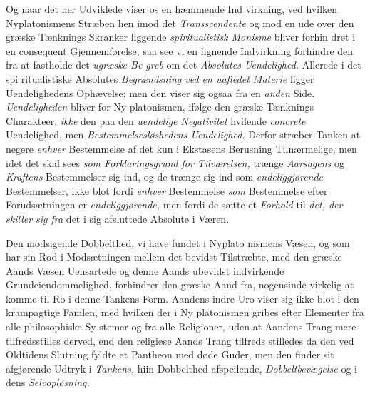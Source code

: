 Og naar det her Udviklede viser os en hæmmende Ind\-%
virkning, ved hvilken Nyplatonismens Stræben hen imod det
\emph{Transscendente} og mod en ude over den græske Tænknings
Skranker liggende \emph{spiritualistisk Monisme} bliver forhin\-%
dret i en consequent Gjennemførelse, saa see vi en lignende
Indvirkning forhindre den fra at fastholde det \emph{ugræske Be\-%
greb} om det \emph{Absolutes Uendelighed.} Allerede i det spi\-%
ritualistiske Absolutes \emph{Begrændsning ved en uafledet
Materie} ligger Uendelighedens Ophævelse; men den viser sig
ogsaa fra en \emph{anden} Side. \emph{Uendeligheden} bliver for Ny\-%
platonismen, ifølge den græske Tænknings Charakteer, \emph{ikke}
den paa den \emph{uendelige Negativitet} hvilende \emph{concrete}
Uendelighed, men \emph{Bestemmelsesløshedens Uendelighed.}
Derfor stræber Tanken at negere \emph{enhver} Bestemmelse af det
kun i Ekstasens Berusning Tilnærmelige, men idet det skal
sees \emph{som Forklaringsgrund for Tilværelsen,} trænge
\emph{Aarsagens} og \emph{Kraftens} Bestemmelser sig ind, og de trænge
sig ind som \emph{endeliggjørende} Bestemmelser, ikke blot fordi
\emph{enhver} Bestemmelse \emph{som} Bestemmelse efter Forudsætningen
er \emph{endeliggjørende,} men fordi de sætte et \emph{Forhold} til
\emph{det, der skiller sig fra} det i sig afsluttede Absolute i
Væren.

Den modsigende Dobbelthed, vi have fundet i Nyplato\-%
nismens Væsen, og som har sin Rod i Modsætningen mellem
det bevidst Tilstræbte, med den græske Aands Væsen Uensartede
og denne Aands ubevidst indvirkende Grundeiendommelighed,
forhindrer den græske Aand fra, nogensinde virkelig at komme
til Ro i denne Tankens Form. Aandens indre Uro viser sig
ikke blot i den krampagtige Famlen, med hvilken der i Ny\-%
platonismen gribes efter Elementer fra alle philosophiske Sy\-%
stemer og fra alle Religioner, uden at Aandens Trang mere
tilfredsstilles derved, end den religiøse Aands Trang tilfreds\-%
stilledes da den ved Oldtidens Slutning fyldte et Pantheon
med døde Guder, men den finder sit afgjørende Udtryk i
\emph{Tankens,} hiin Dobbelthed afspeilende, \emph{Dobbeltbevægelse}
og i dens \emph{Selvopløsning.}

